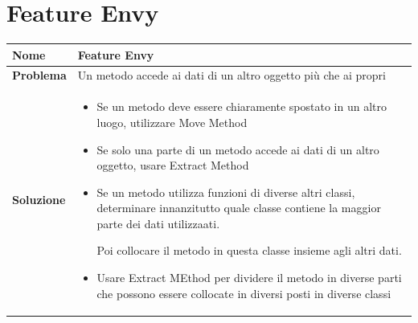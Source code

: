 \newpage
\section{Feature Envy}
\begin{table}[h]
    \centering
    \renewcommand{\arraystretch}{1.2} %
    \begin{tabularx}{\textwidth}{l X}
        \toprule
        \textbf{Nome} & Feature Envy \\
        \midrule
        \textbf{Problema} & Un metodo accede ai dati di un altro oggetto più che ai propri \\
        \midrule
        \textbf{Soluzione} & 
        \begin{itemize}
            \item Se un metodo deve essere chiaramente spostato in un altro luogo, utilizzare Move Method
            \item Se solo una parte di un metodo accede ai dati di un altro oggetto, usare Extract Method
            \item Se un metodo utilizza funzioni di diverse altri classi, determinare innanzitutto quale classe contiene la maggior parte dei dati utilizzaati.

            Poi collocare il metodo in questa classe insieme agli altri dati.
            \item Usare Extract MEthod per dividere il metodo in diverse parti che possono essere collocate in diversi posti in diverse classi
        \end{itemize}
        \\ %
        \bottomrule
    \end{tabularx}
\end{table}

